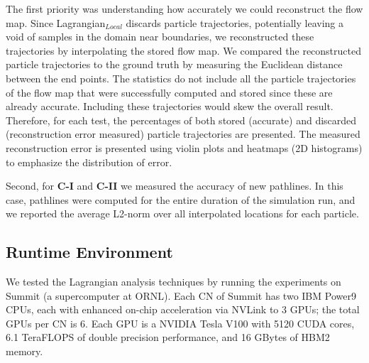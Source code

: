 The first priority was understanding how accurately we could reconstruct the flow map. 
%
Since Lagrangian$_{Local}$ discards particle trajectories, potentially leaving a void of samples in the domain near boundaries, we reconstructed these trajectories by interpolating the stored flow map.
%
We compared the reconstructed particle trajectories to the ground truth by measuring the Euclidean distance between the end points.
%
The statistics do not include all the particle trajectories of the flow map that were successfully computed and stored since these are already accurate.
%
Including these trajectories would skew the overall result.
%
Therefore, for each test, the percentages of both stored (accurate) and discarded (reconstruction error measured) particle trajectories are presented.
%
The measured reconstruction error is presented using violin plots and heatmaps (2D histograms) to emphasize the distribution of error. 

Second, for \textbf{C-I} and \textbf{C-II} we measured the accuracy of new pathlines.
%
In this case, pathlines were computed for the entire duration of the simulation run, and we reported the average L2-norm over all interpolated locations for each particle.
%

%
\subsection{Runtime Environment}
\label{sec:runtime}
We tested the Lagrangian analysis techniques by running the experiments on Summit (a supercomputer at ORNL).
%
Each CN of Summit has two IBM Power9 CPUs,
%
each with enhanced on-chip acceleration via NVLink to 3 GPUs; the total GPUs per CN is 6.
%
Each GPU is a NVIDIA Tesla V100 with 5120 CUDA cores, 6.1 TeraFLOPS of double precision performance, and 16 GBytes of HBM2 memory.
